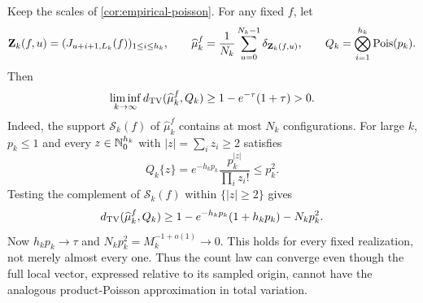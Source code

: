 \begin{empiricalobstruction}
\label{rem:empirical-field-obstruction}
Keep the scales of \cref{cor:empirical-poisson}. For any fixed $f$, let
\[
 \mathbf Z_k(f,u)=(J_{u+i+1,L_k}(f))_{1\le i\le h_k},\qquad
 \widehat\mu_k^f=\frac1{N_k}\sum_{u=0}^{N_k-1}\delta_{\mathbf Z_k(f,u)},
 \qquad Q_k=\bigotimes_{i=1}^{h_k}\operatorname{Pois}(p_k).
\]
Then
\[
 \liminf_{k\to\infty}d_{\mathrm{TV}}(\widehat\mu_k^f,Q_k)
       \ge 1-e^{-\tau}(1+\tau)>0.
\]
Indeed, the support $\mathscr S_k(f)$ of $\widehat\mu_k^f$ contains at
most $N_k$ configurations. For large $k$, $p_k\le1$ and every
$z\in\mathbb N_0^{h_k}$ with $|z|=\sum_i z_i\ge2$ satisfies
\[
 Q_k\{z\}=e^{-h_kp_k}\frac{p_k^{|z|}}{\prod_i z_i!}\le p_k^2.
\]
Testing the complement of $\mathscr S_k(f)$ within $\{|z|\ge2\}$ gives
\[
 d_{\mathrm{TV}}(\widehat\mu_k^f,Q_k)
 \ge 1-e^{-h_kp_k}(1+h_kp_k)-N_kp_k^2.
\]
Now $h_kp_k\to\tau$ and $N_kp_k^2=M_k^{-1+o(1)}\to0$.
This holds for every fixed realization, not merely almost every one.
Thus the count law can converge even though the full local vector,
expressed relative to its sampled origin, cannot have the analogous
product-Poisson approximation in total variation.
\end{empiricalobstruction}
